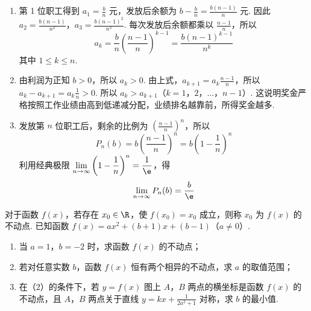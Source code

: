 \begin{solution}
\begin{enumerate}
\item 第 1 位职工得到 \(a_1=\frac{b}{n}\) 元，发放后余额为 \(b-\frac{b}{n}=\frac{b(n-1)}{n}\) 元. 因此 \(a_2=\frac{b(n-1)}{n^2}\)，\(a_3=\frac{b(n-1)^2}{n^3}\). 每次发放后余额都乘以 \(\frac{n-1}{n}\)，所以
\[
a_k=\frac{b}{n}\left(\frac{n-1}{n}\right)^{k-1}=\frac{b(n-1)^{k-1}}{n^k}
\]
其中 \(1\leqslant k\leqslant n\).

\item 由利润为正知 \(b>0\)，所以 \(a_k>0\). 由上式，\(a_{k+1}=a_k\frac{n-1}{n}\)，所以 \(a_k-a_{k+1}=a_k\frac1n>0\).
所以 \(a_k>a_{k+1}\)（\(k=1\)，\(2\)，\(\dots\)，\(n-1\)）. 这说明奖金严格按照工作业绩由高到低递减分配，业绩排名越靠前，所得奖金越多.

\item 发放第 \(n\) 位职工后，剩余的比例为 \(\left(\frac{n-1}{n}\right)^n\)，所以
\[
P_n(b)=b\left(\frac{n-1}{n}\right)^n=b\left(1-\frac1n\right)^n
\]
利用经典极限 \(\displaystyle\lim_{n\to\infty}\left(1-\frac1n\right)^n=\frac1{\e}\)，得
\[
\lim_{n\to\infty}P_n(b)=\frac{b}{\e}
\]
\end{enumerate}
\end{solution}

\begin{problem}
对于函数 \( f(x) \)，若存在 \( x_0 \in \R \)，使 \( f(x_0) = x_0 \) 成立，则称 \( x_0 \) 为 \( f(x) \) 的不动点. 已知函数 \( f(x) = ax^2 + (b + 1)x + (b - 1) \)（\(a \neq 0\)）.
\begin{enumerate}
\item 当 \(a = 1\)，\(b = -2\) 时，求函数 \(f(x)\) 的不动点；
\item 若对任意实数 \(b\)，函数 \(f(x)\) 恒有两个相异的不动点，求 \(a\) 的取值范围；
\item 在（2）的条件下，若 \(y = f(x)\) 图上 \(A\)，\(B\) 两点的横坐标是函数 \(f(x)\) 的不动点，且 \(A\)，\(B\) 两点关于直线 \(y = kx + \frac{1}{2a^2 + 1}\) 对称，求 \(b\) 的最小值.
\end{enumerate}
\end{problem}

